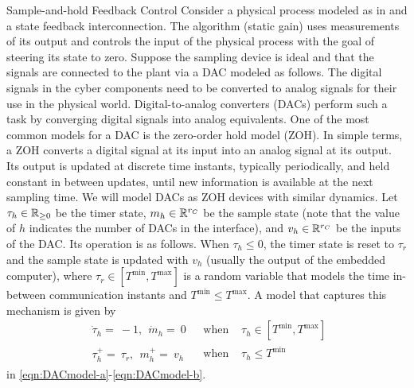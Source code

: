 \begin{example}{Sample-and-hold Feedback Control}
\label{ex:S&Hcontrol}
Consider a physical process modeled as in 
and a state feedback interconnection.
The algorithm (static gain) uses measurements of its
output and controls the input of the physical process with the goal of steering its state to zero. 
Suppose the sampling device is ideal and that the signals are connected to the plant via a DAC modeled as 
\IfSAE
{
follows.
The digital signals in the cyber components need to be converted
to analog signals for their use in the physical world.
Digital-to-analog converters (DACs) perform such a task 
by converging digital signals into analog equivalents.
One of the most common models for a DAC
is the zero-order hold model (ZOH). In simple terms, a ZOH converts
a digital signal at its input into an analog signal 
at its output.  
Its output is updated at discrete time instants, typically periodically,
and held constant in between updates, until new information is available at the
next sampling time. We will model DACs as ZOH devices with similar dynamics. Let
$\tau_h\in{{\mathbb R}_{\geq 0}}$ be the timer state, $m_h \in {\mathbb R}^{r_C}$ be the
sample state (note that the value of $h$ indicates the number of DACs
in the interface), and $v_h \in {\mathbb R}^{r_C}$ be the inputs of the DAC.
Its operation is as follows. When $\tau_h \leq 0$, the timer state
is reset to $\tau_r$ and the sample state is updated with $v_h$ (usually
the output of the embedded computer), where $\tau_r\in[T^{\mbox{min}},T^{\mbox{max}}]$ is a random variable that models the time in-between communication instants and $T^{\mbox{min}}\leq T^{\mbox{max}}$.  A model that captures this
mechanism is given by 
\begin{eqnarray}\label{eqn:DACmodel-a}
\left.
\begin{array}{l}
\dot{\tau}_h =\ -1,   \ \
\dot{m}_h  =\ 0
\end{array}
\right. & \mbox{ when }& \tau_h \in [T^{\mbox{min}},T^{\mbox{max}}] \\ \label{eqn:DACmodel-b}
\left.
\begin{array}{ll}
\tau_h^+  =\ \tau_r,  \ \
m_h^+ =\ v_h
\end{array}
\right. & \mbox{ when }& \tau_h \leq T^{\mbox{min}}
\end{eqnarray}
}
{in \eqref{eqn:DACmodel-a}-\eqref{eqn:DACmodel-b}.}



\end{example}
